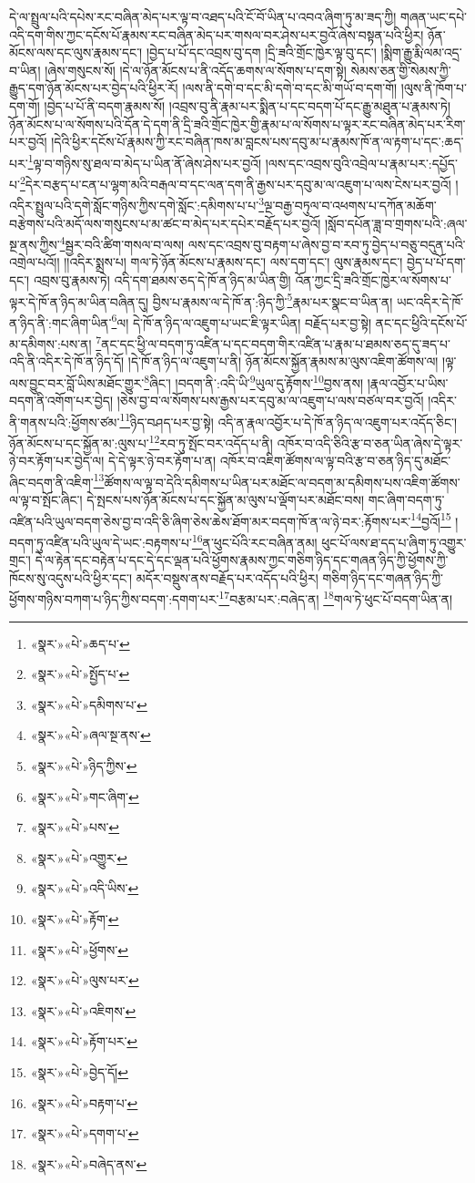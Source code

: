 དེ་ལ་སྤྲུལ་པའི་དཔེས་རང་བཞིན་མེད་པར་ལྟ་བ་འཐད་པའི་ངོ་བོ་ཡིན་པ་འབའ་ཞིག་ཏུ་མ་ཟད་ཀྱི། གཞན་ཡང་དཔེ་འདི་དག་གིས་ཀྱང་དངོས་པོ་རྣམས་རང་བཞིན་མེད་པར་གསལ་བར་ཤེས་པར་བྱའོ་ཞེས་བསྟན་པའི་ཕྱིར། ཉོན་མོངས་ལས་དང་ལུས་རྣམས་དང་། །བྱེད་པ་པོ་དང་འབྲས་བུ་དག །དྲི་ཟའི་གྲོང་ཁྱེར་ལྟ་བུ་དང་། །སྨིག་རྒྱུ་རྨི་ལམ་འདྲ་བ་ཡིན། །ཞེས་གསུངས་སོ། །དེ་ལ་ཉོན་མོངས་པ་ནི་འདོད་ཆགས་ལ་སོགས་པ་དག་སྟེ། སེམས་ཅན་གྱི་སེམས་ཀྱི་རྒྱུད་དག་ཉོན་མོངས་པར་བྱེད་པའི་ཕྱིར་རོ། །ལས་ནི་དགེ་བ་དང་མི་དགེ་བ་དང་མི་གཡོ་བ་དག་གོ། །ལུས་ནི་ཁོག་པ་དག་གོ། །བྱེད་པ་པོ་ནི་བདག་རྣམས་སོ། །འབྲས་བུ་ནི་རྣམ་པར་སྨིན་པ་དང་བདག་པོ་དང་རྒྱུ་མཐུན་པ་རྣམས་ཏེ། ཉོན་མོངས་པ་ལ་སོགས་པའི་དོན་དེ་དག་ནི་དྲི་ཟའི་གྲོང་ཁྱེར་གྱི་རྣམ་པ་ལ་སོགས་པ་ལྟར་རང་བཞིན་མེད་པར་རིག་པར་བྱའོ། །དེའི་ཕྱིར་དངོས་པོ་རྣམས་ཀྱི་རང་བཞིན་ཁས་མ་བླངས་པས་དབུ་མ་པ་རྣམས་ཁོ་ན་ལ་རྟག་པ་དང་:ཆད་པར་\footnote{«སྣར་»«པེ་»ཆད་པ་}ལྟ་བ་གཉིས་སུ་ཐལ་བ་མེད་པ་ཡིན་ནོ་ཞེས་ཤེས་པར་བྱའོ། །ལས་དང་འབྲས་བུའི་འབྲེལ་པ་རྣམ་པར་:དཔྱོད་པ་\footnote{«སྣར་»«པེ་»སྤྱོད་པ་}དེར་བརྩད་པ་ངན་པ་ལྷག་མའི་བརྒལ་བ་དང་ལན་དག་ནི་རྒྱས་པར་དབུ་མ་ལ་འཇུག་པ་ལས་ངེས་པར་བྱའོ། །འདིར་སྤྲུལ་པའི་དགེ་སློང་གཉིས་ཀྱིས་དགེ་སློང་:དམིགས་པ་པ་\footnote{«སྣར་»«པེ་»དམིགས་པ་}ལྔ་བརྒྱ་བཏུལ་བ་འཕགས་པ་དཀོན་མཆོག་བརྩེགས་པའི་མདོ་ལས་གསུངས་པ་མ་ཚང་བ་མེད་པར་དཔེར་བརྗོད་པར་བྱའོ། །སློབ་དཔོན་ཟླ་བ་གྲགས་པའི་:ཞལ་སྔ་ནས་ཀྱིས་\footnote{«སྣར་»«པེ་»ཞལ་སྔ་ནས་}སྦྱར་བའི་ཚིག་གསལ་བ་ལས། ལས་དང་འབྲས་བུ་བརྟག་པ་ཞེས་བྱ་བ་རབ་ཏུ་བྱེད་པ་བཅུ་བདུན་པའི་འགྲེལ་པའོ།། །།འདིར་སྨྲས་པ། གལ་ཏེ་ཉོན་མོངས་པ་རྣམས་དང་། ལས་དག་དང་། ལུས་རྣམས་དང་། བྱེད་པ་པོ་དག་དང་། འབྲས་བུ་རྣམས་ཏེ། འདི་དག་ཐམས་ཅད་དེ་ཁོ་ན་ཉིད་མ་ཡིན་གྱི། འོན་ཀྱང་དྲི་ཟའི་གྲོང་ཁྱེར་ལ་སོགས་པ་ལྟར་དེ་ཁོ་ན་ཉིད་མ་ཡིན་བཞིན་དུ། བྱིས་པ་རྣམས་ལ་དེ་ཁོ་ན་:ཉིད་ཀྱི་\footnote{«སྣར་»«པེ་»ཉིད་ཀྱིས་}རྣམ་པར་སྣང་བ་ཡིན་ན། ཡང་འདིར་དེ་ཁོ་ན་ཉིད་ནི་:གང་ཞིག་ཡིན་\footnote{«སྣར་»«པེ་»གང་ཞིག་}ལ། དེ་ཁོ་ན་ཉིད་ལ་འཇུག་པ་ཡང་ཇི་ལྟར་ཡིན། བརྗོད་པར་བྱ་སྟེ། ནང་དང་ཕྱིའི་དངོས་པོ་མ་དམིགས་:པས་ན། \footnote{«སྣར་»«པེ་»པས་}ནང་དང་ཕྱི་ལ་བདག་ཏུ་འཛིན་པ་དང་བདག་གིར་འཛིན་པ་རྣམ་པ་ཐམས་ཅད་དུ་ཟད་པ་འདི་ནི་འདིར་དེ་ཁོ་ན་ཉིད་དོ། །དེ་ཁོ་ན་ཉིད་ལ་འཇུག་པ་ནི། ཉོན་མོངས་སྐྱོན་རྣམས་མ་ལུས་འཇིག་ཚོགས་ལ། །ལྟ་ལས་བྱུང་བར་བློ་ཡིས་མཐོང་གྱུར་\footnote{«སྣར་»«པེ་»འགྱུར་}ཞིང་། །བདག་ནི་:འདི་ཡི་\footnote{«སྣར་»«པེ་»འདི་ཡིས་}ཡུལ་དུ་རྟོགས་\footnote{«སྣར་»«པེ་»རྟོག་}བྱས་ནས། །རྣལ་འབྱོར་པ་ཡིས་བདག་ནི་འགོག་པར་བྱེད། །ཅེས་བྱ་བ་ལ་སོགས་པས་རྒྱས་པར་དབུ་མ་ལ་འཇུག་པ་ལས་བཙལ་བར་བྱའོ། །འདིར་ནི་གནས་པའི་:ཕྱོགས་ཙམ་\footnote{«སྣར་»«པེ་»ཕྱོགས་}ཉིད་བཤད་པར་བྱ་སྟེ། འདི་ན་རྣལ་འབྱོར་པ་དེ་ཁོ་ན་ཉིད་ལ་འཇུག་པར་འདོད་ཅིང་། ཉོན་མོངས་པ་དང་སྐྱོན་མ་:ལུས་པ་\footnote{«སྣར་»«པེ་»ལུས་པར་}རབ་ཏུ་སྤོང་བར་འདོད་པ་ནི། འཁོར་བ་འདི་ཅིའི་རྩ་བ་ཅན་ཡིན་ཞེས་དེ་ལྟར་ཉེ་བར་རྟོག་པར་བྱེད་ལ། དེ་དེ་ལྟར་ཉེ་བར་རྟོག་པ་ན། འཁོར་བ་འཇིག་ཚོགས་ལ་ལྟ་བའི་རྩ་བ་ཅན་ཉིད་དུ་མཐོང་ཞིང་བདག་ནི་འཇིག་\footnote{«སྣར་»«པེ་»འཇིགས་}ཚོགས་ལ་ལྟ་བ་དེའི་དམིགས་པ་ཡིན་པར་མཐོང་ལ་བདག་མ་དམིགས་པས་འཇིག་ཚོགས་ལ་ལྟ་བ་སྤོང་ཞིང་། དེ་སྤངས་པས་ཉོན་མོངས་པ་དང་སྐྱོན་མ་ལུས་པ་ལྡོག་པར་མཐོང་བས། གང་ཞིག་བདག་ཏུ་འཛིན་པའི་ཡུལ་བདག་ཅེས་བྱ་བ་འདི་ཅི་ཞིག་ཅེས་ཆེས་ཐོག་མར་བདག་ཁོ་ན་ལ་ཉེ་བར་:རྟོགས་པར་\footnote{«སྣར་»«པེ་»རྟོག་པར་}བྱའོ།\footnote{«སྣར་»«པེ་»བྱེད་དོ།} །བདག་ཏུ་འཛིན་པའི་ཡུལ་དེ་ཡང་:བརྟགས་པ་\footnote{«སྣར་»«པེ་»བརྟག་པ་}ན་ཕུང་པོའི་རང་བཞིན་ནམ། ཕུང་པོ་ལས་ཐ་དད་པ་ཞིག་ཏུ་འགྱུར་གྲང་། དེ་ལ་རྟེན་དང་བརྟེན་པ་དང་དེ་དང་ལྡན་པའི་ཕྱོགས་རྣམས་ཀྱང་གཅིག་ཉིད་དང་གཞན་ཉིད་ཀྱི་ཕྱོགས་ཀྱི་ཁོངས་སུ་འདུས་པའི་ཕྱིར་དང་། མདོར་བསྡུས་ནས་བརྗོད་པར་འདོད་པའི་ཕྱིར། གཅིག་ཉིད་དང་གཞན་ཉིད་ཀྱི་ཕྱོགས་གཉིས་བཀག་པ་ཉིད་ཀྱིས་བདག་:དགག་པར་\footnote{«སྣར་»«པེ་»དགག་པ་}བརྩམ་པར་:བཞེད་ན། \footnote{«སྣར་»«པེ་»བཞེད་ནས་}གལ་ཏེ་ཕུང་པོ་བདག་ཡིན་ན། 